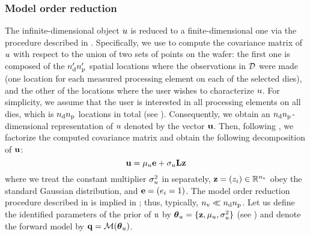 \subsubsection{Model order reduction} 
The infinite-dimensional object $u$ is reduced to a finite-dimensional one via the procedure described in .
Specifically, we use  to compute the covariance matrix of $u$ with respect to the union of two sets of points on the wafer: the first one is composed of the ${n_\text{d}'} {n_\text{p}'}$ spatial locations where the observations in $\mathcal{D}$ were made (one location for each measured processing element on each of the selected dies), and the other of the locations where the user wishes to characterize $u$.
For simplicity, we assume that the user is interested in all processing elements on all dies, which is ${n_\text{d}} {n_\text{p}}$ locations in total (see ). Consequently, we obtain an ${n_\text{d}} {n_\text{p}}$-dimensional representation of $u$ denoted by the vector $\mathbf{u}$. Then, following , we factorize the computed covariance matrix and obtain the following decomposition of $\mathbf{u}$:
\begin{equation} \elabel{kl-approximation}
  \vu = \mu_\u \vI + \sigma_\u \mKL \vz
\end{equation}
where we treat the constant multiplier $\sigma^2_u$ in  separately, $\mathbf{z} = (z_i) \in \mathbb{R}^{n_\text{v}}$ obey the standard Gaussian distribution, and $\mathbf{e} = (e_i = 1)$. The model order reduction procedure described in  is implied in ; thus, typically, ${n_\text{v}} \ll {n_\text{d}} {n_\text{p}}$. Let us define the identified parameters of the prior of $u$ by ${\boldsymbol\theta}_u = \{ \mathbf{z}, \mu_u, \sigma^2_u \}$ (see ) and denote the forward model by $\mvT = \model{\vparam_\u}$.

